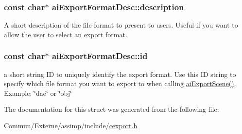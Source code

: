 \subsubsection[{\texorpdfstring{description}{description}}]{\setlength{\rightskip}{0pt plus 5cm}const char$\ast$ ai\+Export\+Format\+Desc\+::description}\hypertarget{structai_export_format_desc_a9c84c4b07c5177fb6539b9bdf90236fb}{}\label{structai_export_format_desc_a9c84c4b07c5177fb6539b9bdf90236fb}
A short description of the file format to present to users. Useful if you want to allow the user to select an export format. 
\subsubsection[{\texorpdfstring{id}{id}}]{\setlength{\rightskip}{0pt plus 5cm}const char$\ast$ ai\+Export\+Format\+Desc\+::id}\hypertarget{structai_export_format_desc_afe216eaea3a04abca041e5c253f94bbf}{}\label{structai_export_format_desc_afe216eaea3a04abca041e5c253f94bbf}
a short string ID to uniquely identify the export format. Use this ID string to specify which file format you want to export to when calling \hyperlink{cexport_8h_a9615510b8430a9da4f435a72148128dd}{ai\+Export\+Scene()}. Example\+: \char`\"{}dae\char`\"{} or \char`\"{}obj\char`\"{} 

The documentation for this struct was generated from the following file\+:\begin{DoxyCompactItemize}
\item 
Commun/\+Externe/assimp/include/\hyperlink{cexport_8h}{cexport.\+h}\end{DoxyCompactItemize}
